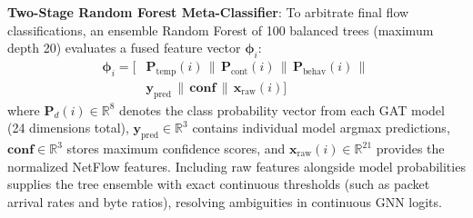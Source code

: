 \documentclass[12pt,a4paper]{report}
\begin{document}
\textbf{Two-Stage Random Forest Meta-Classifier}: To arbitrate final flow classifications, an ensemble Random Forest of 100 balanced trees (maximum depth 20) evaluates a fused feature vector $\boldsymbol{\phi}_i$:
\begin{equation}
\begin{split}
\boldsymbol{\phi}_i = \big[ & \boldsymbol{P}_{\text{temp}}(i) \,\|\, \boldsymbol{P}_{\text{cont}}(i) \,\|\, \boldsymbol{P}_{\text{behav}}(i) \,\|\, \\
& \boldsymbol{y}_{\text{pred}} \,\|\, \boldsymbol{conf} \,\|\, \boldsymbol{x}_{\text{raw}}(i) \big]
\end{split}
\label{eq:meta_vec}
\end{equation}
where $\boldsymbol{P}_d(i) \in \mathbb{R}^8$ denotes the class probability vector from each GAT model (24 dimensions total), $\boldsymbol{y}_{\text{pred}} \in \mathbb{R}^3$ contains individual model argmax predictions, $\boldsymbol{conf} \in \mathbb{R}^3$ stores maximum confidence scores, and $\boldsymbol{x}_{\text{raw}}(i) \in \mathbb{R}^{21}$ provides the normalized NetFlow features. Including raw features alongside model probabilities supplies the tree ensemble with exact continuous thresholds (such as packet arrival rates and byte ratios), resolving ambiguities in continuous GNN logits.
\end{document}

